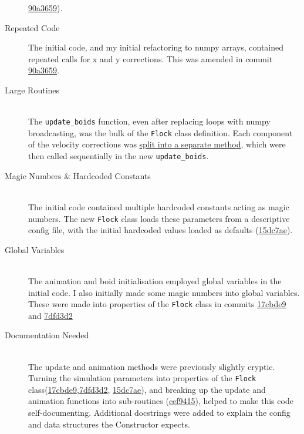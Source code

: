 \documentclass[12pt,a4paper]{article}
\begin{document}
\begin{description}
    \href{https://github.com/padraic-padraic/bad-boids/commit/90a365990fd206db85537bc58c9a239e8dc4681a}{90a3659}).
    \item[Repeated Code]
    The initial code, and my initial refactoring to numpy arrays, contained repeated calls for x and y corrections. This was amended in commit \href{https://github.com/padraic-padraic/bad-boids/commit/90a365990fd206db85537bc58c9a239e8dc4681a}{90a3659}.
    \item[Large Routines] \hfill \\
    The \texttt{update\_boids} function, even after replacing loops with numpy broadcasting, was the bulk of the \texttt{Flock} class definition. Each component of the velocity corrections was \href{https://github.com/padraic-padraic/bad-boids/commit/cef9415816bd786d082225aec7049b268067c6f4}{split into a separate method}, which were then called sequentially in the new \texttt{update\_boids}.
    \item[Magic Numbers \& Hardcoded Constants] \hfill \\
    The initial code contained multiple hardcoded constants acting as magic numbers. The new \texttt{Flock} class loads these parameters from a descriptive config file, with the initial hardcoded values loaded as defaults (\href{https://github.com/padraic-padraic/bad-boids/commit/15dc7ae43b8428ce7197e6ccbde28344f478fc05}{15dc7ae}).
    \item[Global Variables] \hfill \\
    The animation and boid initialisation employed global variables in the initial code. I also initially made some magic numbers into global variables. These were made into properties of the \texttt{Flock} class in commits \href{https://github.com/padraic-padraic/bad-boids/commit/17cbde9dd7f2d8dd756ac43fcf11577f34c0b754}{17cbde9} and  \href{https://github.com/padraic-padraic/bad-boids/commit/7dfd3d25a5b6de1802cb93cca317e5fb79a3af8f}{7dfd3d2}
    \item[Documentation Needed] \hfill \\
    The update and animation methods were previously slightly cryptic. Turning the simulation parameters into properties of the \texttt{Flock} class(\href{https://github.com/padraic-padraic/bad-boids/commit/17cbde9dd7f2d8dd756ac43fcf11577f34c0b754}{17cbde9},\href{https://github.com/padraic-padraic/bad-boids/commit/7dfd3d25a5b6de1802cb93cca317e5fb79a3af8f}{7dfd3d2}, \href{https://github.com/padraic-padraic/bad-boids/commit/15dc7ae43b8428ce7197e6ccbde28344f478fc05}{15dc7ae}), and breaking up the update and animation functions into sub-routines (\href{https://github.com/padraic-padraic/bad-boids/commit/cef9415816bd786d082225aec7049b268067c6f4}{cef9415}), helped to make this code self-documenting. Additional docstrings were added to explain the config and data structures the Constructor expects.

\end{description}
\end{document}
